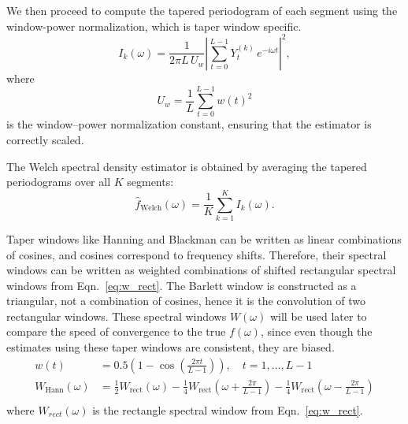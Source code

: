 \documentclass[preprint]{aastex}
\theoremstyle{nonitalicname}
\theoremstyle{plain}
\theoremstyle{remark}
\begin{document}
We then proceed to compute the tapered periodogram of each segment using the window-power normalization, which is taper window specific. 
\begin{equation}\label{eq:tapered_periodogram}
    I_k(\omega)= \frac{1}{2\pi L\,U_w} \left|\sum_{t=0}^{L-1}Y^{(k)}_t\, e^{-i \omega t}\right|^2,
\end{equation}
where
\begin{equation}
    \label{eq:window_power}
    U_w = \frac{1}{L} \sum_{t=0}^{L-1} w(t)^2
\end{equation}
is the window--power normalization constant, ensuring that the estimator
is correctly scaled. 

The Welch spectral density estimator is obtained by averaging the tapered periodograms over all $K$ segments:
\begin{equation}
    \label{eq:welch_estimator}
    \widehat{f}_{\mathrm{Welch}}(\omega)
    =
    \frac{1}{K} \sum_{k=1}^K I_k(\omega).
\end{equation}

Taper windows like Hanning and Blackman can be written as linear combinations of cosines, and cosines correspond to frequency shifts. Therefore, their spectral windows can be written as weighted combinations of shifted rectangular spectral windows from  Eqn.~\ref{eq:w_rect}. The Barlett window is constructed as a triangular, not a combination of cosines, hence it is the convolution of two rectangular windows. These spectral windows $W(\omega)$ will be used later to compare the speed of convergence to the true $f(\omega)$, since even though the estimates using these taper windows are consistent, they are biased. 
\begin{equation}
    \begin{aligned}
        w(t) &= 0.5\left(1-\cos\left( \frac{2\pi t}{L-1}\right)\right), \quad t=1,\dots,L-1\\
        W_{\mathrm{Hann}}(\omega)&=
\frac{1}{2}W_{\mathrm{rect}}(\omega)
-\frac{1}{4}W_{\mathrm{rect}}(\omega + \tfrac{2\pi}{L-1})
-\frac{1}{4}W_{\mathrm{rect}}(\omega - \tfrac{2\pi}{L-1})\\
    \end{aligned}
\end{equation}
where $W_{rect}(\omega)$ is the rectangle spectral window from  Eqn.~\ref{eq:w_rect}.

\end{document}
